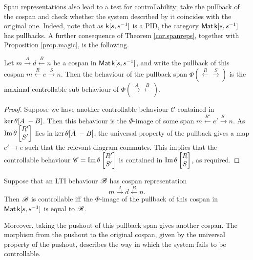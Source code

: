 Span representations also lead to a test for controllability: take
the pullback of the cospan and check whether the system described by it
coincides with the original one. Indeed, note that as ${\mathsf{k}[s,s^{-1}]}$ is a PID, the
category $\operatorname{\mathsf{Mat}}{\mathsf{k}[s,s^{-1}]}$ has pullbacks. A further consequence of Theorem
\ref{cor.spanreps}, together with Proposition  \ref{prop.magic}, is the following. 

\begin{proposition} \label{prop.ctrlablepart}
  Let $m \xrightarrow{A} d \xleftarrow{B} n$ be a cospan in $\operatorname{\mathsf{Mat}}{\mathsf{k}[s,s^{-1}]}$, and write
  the pullback of this cospan $m \xleftarrow{R} e \xrightarrow{S} n$. Then the
  behaviour of the pullback span $\Phi(\xleftarrow{R}\xrightarrow{S})$ is
  the maximal controllable sub-behaviour of
  $\Phi(\xrightarrow{A}\xleftarrow{B})$.
\end{proposition}
\begin{proof}
  Suppose we have another controllable behaviour $\mathscr{C}$ contained in
  $\ker\theta [A\;-B]$. Then this behaviour is the $\Phi$-image of some span
  $m \xleftarrow{R'} e' \xrightarrow{S'}n$. As $\mathrm{Im}\,\theta\begin{bmatrix} R' \\
    S'\end{bmatrix}$ lies in $\ker\theta [A\;-B]$, the universal property of
  the pullback gives a map $e' \to e$ such that the relevant diagram commutes.
  This implies that the controllable behaviour $\mathscr{C} =
  \mathrm{Im}\,\theta\begin{bmatrix} R' \\ S'\end{bmatrix}$ is contained in $\mathrm{Im}\,\theta
  \begin{bmatrix} R \\ S\end{bmatrix}$, as required. 
\end{proof}

\begin{corollary}
  Suppose that an LTI behaviour ${\mathscr B}$ has cospan representation
  \[
    m \stackrel{A}\longrightarrow d \stackrel{B}\longleftarrow n.
  \]
  Then ${\mathscr B}$ is controllable iff the $\Phi$-image of the pullback of this cospan
  in $\operatorname{\mathsf{Mat}}{\mathsf{k}[s,s^{-1}]}$ is equal to ${\mathscr B}$.
\end{corollary}

Moreover, taking the pushout of this pullback span gives another cospan. The
morphism from the pushout to the original cospan, given by the universal
property of the pushout, describes the way in which the system fails to be
controllable.

